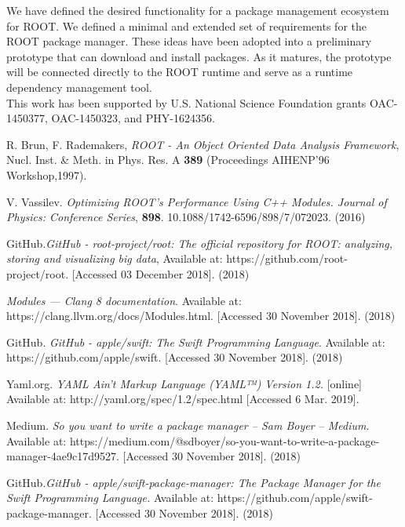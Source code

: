 \documentclass{webofc}
\begin{document}
We have defined the desired functionality for a package management ecosystem for ROOT. We defined a minimal and extended set of requirements for the ROOT package manager. These ideas have been adopted into a preliminary prototype that can download and install packages. As it matures, the prototype will be connected directly to the ROOT runtime and serve as a runtime dependency management tool.\\

{\small This work has been supported by U.S. National Science Foundation grants OAC-1450377, OAC-1450323, and PHY-1624356.}

\begin{thebibliography}{plain}

R. Brun, F. Rademakers, \textit{ROOT - An Object Oriented Data Analysis Framework}, Nucl. Inst. \& Meth. in Phys. Res. A  \textbf{389} (Proceedings AIHENP'96 Workshop,1997).

V. Vassilev. \textit{Optimizing ROOT's Performance Using C++ Modules. Journal of Physics: Conference Series}, \textbf{898}. 10.1088/1742-6596/898/7/072023. (2016)

GitHub.\textit{GitHub - root-project/root: The official repository for ROOT: analyzing, storing and visualizing big data}, Available at: https://github.com/root-project/root. [Accessed 03 December 2018]. (2018)

\textit{Modules — Clang 8 documentation}. Available at: https://clang.llvm.org/docs/Modules.html. [Accessed 30 November 2018]. (2018)

GitHub. \textit{GitHub - apple/swift: The Swift Programming Language}. Available at: https://github.com/apple/swift. [Accessed 30 November 2018]. (2018)

  Yaml.org. \textit{YAML Ain’t Markup Language (YAML™) Version 1.2.} [online] Available at: http://yaml.org/spec/1.2/spec.html [Accessed 6 Mar. 2019].

Medium. \textit{So you want to write a package manager – Sam Boyer – Medium}. Available at: https://medium.com/@sdboyer/so-you-want-to-write-a-package-manager-4ae9c17d9527. [Accessed 30 November 2018]. (2018)

GitHub.\textit{GitHub - apple/swift-package-manager: The Package Manager for the Swift Programming Language.} Available at: https://github.com/apple/swift-package-manager. [Accessed 30 November 2018]. (2018)



\end{thebibliography}
\end{document}
